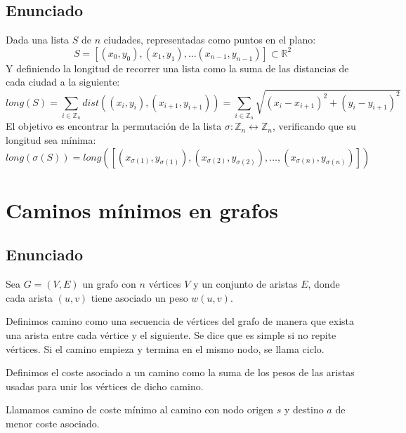 \documentclass[a4paper, 11pt]{article} %
\begin{document}
  \subsection{Enunciado}
  	Dada una lista $S$ de $n$ ciudades, representadas como puntos en el plano:
  	\begin{equation}
  	    S = [(x_0,y_0), (x_1,y_1), \dots (x_{n-1},y_{n-1})] \subset \mathbb{R}^2
  	\end{equation}
  	Y definiendo la longitud de recorrer una lista como la suma de las distancias de cada ciudad a la siguiente:
  	\begin{equation}
  	    long(S) = \sum_{i \in \mathbb{Z}_n} dist((x_i,y_i), (x_{i+1}, y_{i+1})) = \sum_{i \in \mathbb{Z}_n} \sqrt{(x_i-x_{i+1})^2 + (y_i-y_{i+1})^2}
  	\end{equation}
  	El objetivo es encontrar la permutación de la lista $\sigma : \mathbb{Z}_n \leftrightarrow \mathbb{Z}_n$, verificando que su longitud sea mínima:
  	\begin{equation}
  	    long(\sigma(S)) = long([(x_{\sigma(1)},y_{\sigma(1)}), (x_{\sigma(2)},y_{\sigma(2)}), \dots, (x_{\sigma(n)},y_{\sigma(n)})])
      \end{equation}
      

\section{Caminos mínimos en grafos}
  \subsection{Enunciado}
    Sea $G=(V,E)$ un grafo con $n$ vértices $V$ y un conjunto de aristas $E$,
    donde cada arista $(u,v)$ tiene asociado un peso $w(u,v)$.
    
    Definimos camino como una secuencia de vértices del grafo de manera que exista una arista entre cada vértice y el siguiente. Se dice que es simple si no repite vértices. Si el camino empieza y termina en el mismo nodo, se llama ciclo.
    
    Definimos el coste asociado a un camino como la suma de los pesos de las aristas usadas para unir los vértices de dicho camino.
     
    Llamamos camino de coste mínimo al camino con nodo origen $s$ y destino $a$ de menor coste asociado.
    
\end{document}
